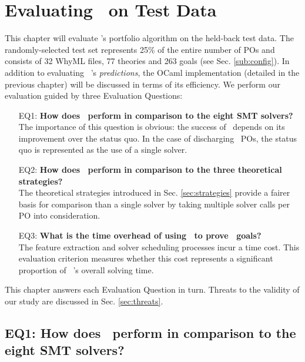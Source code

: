 \chapter{Evaluating \where~on Test Data}%
\thispagestyle{nohead}
\label{Evaluation} 

This chapter will evaluate \where's portfolio algorithm on the held-back test data.
The randomly-selected test set represents 25\% of the entire number of POs and consists of 32 WhyML files, 77 theories and 263 goals  (see Sec. \ref{sub:config}).
In addition to evaluating \where~'s \textit{predictions}, the OCaml implementation (detailed in the previous chapter) will be discussed in terms of its efficiency.   
We perform our evaluation guided by three Evaluation Questions:
\begin{itemize}
	\item[EQ1:] \textbf{How does \where~perform in comparison to the eight SMT solvers?}\\
	The importance of this question is obvious: the success of \where~depends on its improvement over the status quo. In the case of discharging \why~POs, the status quo is represented as the use of a single solver.
	\item[EQ2:] \textbf{How does \where~perform in comparison to the three theoretical strategies?}\\
	The theoretical strategies introduced in Sec. \ref{sec:strategies} provide a fairer basis for comparison than a single solver by taking multiple solver calls per PO into consideration.
	\item[EQ3:] \textbf{What is the time overhead of using \where~to prove \why~goals?}\\
	The feature extraction and solver scheduling processes incur a time cost. This evaluation criterion measures whether this cost represents a significant proportion of \where~'s overall solving time.    	
\end{itemize}
This chapter answers each Evaluation Question in turn.
Threats to the validity of our study are discussed in Sec. \ref{sec:threats}. 

\section{EQ1: How does \where~perform in comparison to the eight SMT solvers?}

